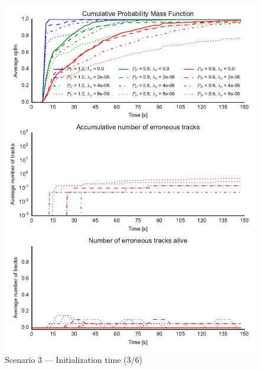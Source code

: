 \begin{figure}
\centering
\includegraphics{Figures/plots/Scenario3_Init-Time(3-6).pdf}
\caption{Scenario 3 --- Initialization time (3/6)}\label{fig:init3_time_3-6}
\end{figure}
